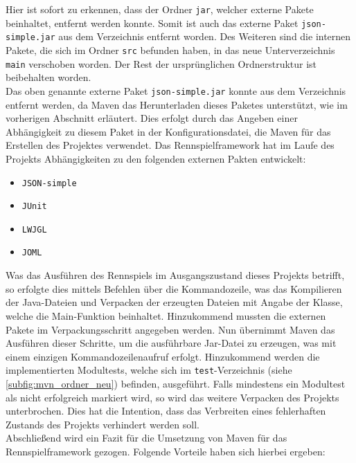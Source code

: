 Hier ist sofort zu erkennen, dass der Ordner \texttt{jar}, welcher externe Pakete beinhaltet,  entfernt werden konnte. Somit ist auch das externe Paket \texttt{json-simple.jar} aus dem Verzeichnis entfernt worden. Des Weiteren sind die internen Pakete, die sich im Ordner \texttt{src} befunden haben, in das neue Unterverzeichnis \texttt{main} verschoben worden. Der Rest der ursprünglichen Ordnerstruktur ist beibehalten worden.\\ 
Das oben genannte externe Paket \texttt{json-simple.jar} konnte aus dem Verzeichnis entfernt werden, da Maven das Herunterladen dieses Paketes unterstützt, wie im vorherigen Abschnitt erläutert. Dies erfolgt durch das Angeben einer Abhängigkeit zu diesem Paket in der Konfigurationsdatei, die Maven für das Erstellen des Projektes verwendet. Das Rennspielframework hat im Laufe des Projekts Abhängigkeiten zu den folgenden externen Pakten entwickelt:
\begin{itemize}
	\item \texttt{JSON-simple}
	\item \texttt{JUnit}
	\item \texttt{LWJGL}
	\item \texttt{JOML}
\end{itemize}
Was das Ausführen des Rennspiels im Ausgangszustand dieses Projekts betrifft, so erfolgte dies mittels Befehlen über die Kommandozeile, was das Kompilieren der Java-Dateien und Verpacken der erzeugten Dateien mit Angabe der Klasse, welche die Main-Funktion beinhaltet. Hinzukommend mussten die externen Pakete im Verpackungsschritt angegeben werden. Nun übernimmt Maven das Ausführen dieser Schritte, um die ausführbare Jar-Datei zu erzeugen, was mit einem einzigen Kommandozeilenaufruf erfolgt. Hinzukommend werden die implementierten Modultests, welche sich im \texttt{test}-Verzeichnis (siehe \autoref{subfig:mvn_ordner_neu}) befinden, ausgeführt. Falls mindestens ein Modultest als nicht erfolgreich markiert wird, so wird das weitere Verpacken des Projekts unterbrochen. Dies hat die Intention, dass das Verbreiten eines fehlerhaften Zustands des Projekts verhindert werden soll.\\
Abschließend wird ein Fazit für die Umsetzung von Maven für das Rennspielframework gezogen. Folgende Vorteile haben sich hierbei ergeben:
